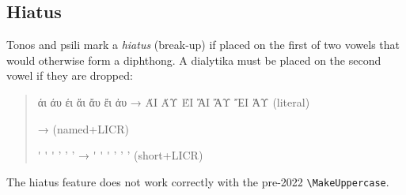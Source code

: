 \documentclass[a4paper]{article}
\newcommand*{\Greek}{\foreignlanguage{greek}}
\newcommand*{\Greek}{\ensuregreek}
\newcommand{\cs}[1]{\texttt{\textbackslash#1}}
\newcommand*{\TestUppercase}[1]{%
  \Greek{#1 → \MakeUppercase{#1}}%
}
\begin{document}
\subsection{Hiatus}

Tonos and psili mark a \emph{hiatus} (break-up) if placed on
the first of two vowels that would otherwise form a diphthong.
A dialytika must be placed on the second vowel if they are dropped:

\begin{quote}
  \TestUppercase{άι άυ έι ἄι ἄυ ἔι ἀυ} (literal)

  \TestUppercase{\acctonos\alpha\iota{}
                 \acctonos\alpha\upsilon{}
                 \acctonos\epsilon\iota{}
                 \accpsilioxia\alpha\iota{}
                 \accpsilioxia\alpha\upsilon{}
                 \accpsilioxia\epsilon\iota{}
                 \accpsili\alpha\upsilon
                 } (named+LICR)

  \TestUppercase{\'{\alpha}\iota{}     \'{\alpha}\upsilon{}
                 \'{\epsilon}\iota{}   \>'{\alpha}\iota{}
                 \>'{\alpha}\upsilon{} \>'{\epsilon}\iota{}
                 \>{\alpha}\upsilon
                 } (short+LICR)
\end{quote}

The hiatus feature does not work correctly with the pre-2022
\cs{MakeUppercase}.
\end{document}
